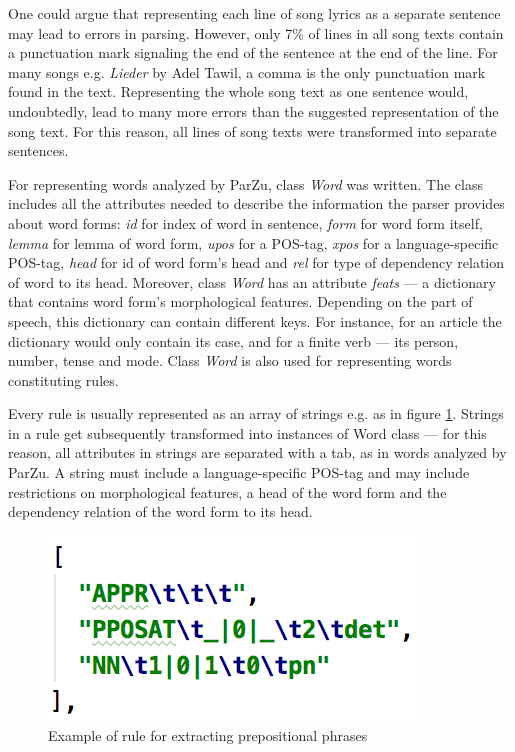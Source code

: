 One could argue that representing each line of song lyrics as a separate sentence may lead to errors in parsing. However, only 7\% of lines in all song texts contain a punctuation mark signaling the end of the sentence at the end of the line. For many songs e.g. \textit{Lieder} by Adel Tawil, a comma is the only punctuation mark found in the text. Representing the whole song text as one sentence would, undoubtedly, lead to many more errors than the suggested representation of the song text. For this reason, all lines of song texts were transformed into separate sentences. 

For representing words analyzed by ParZu, class \textit{Word} was written. The class includes all the attributes needed to describe the information the parser provides about word forms: \textit{id} for index of word in sentence, \textit{form} for word form itself, \textit{lemma} for lemma of word form, \textit{upos} for a POS-tag, \textit{xpos} for a language-specific POS-tag, \textit{head} for id of word form's head and \textit{rel} for type of dependency relation of word to its head. Moreover, class \textit{Word} has an attribute \textit{feats} --- a dictionary that contains word form's morphological features. Depending on the part of speech, this dictionary can contain different keys. For instance, for an article the dictionary would only contain its case, and for a finite verb --- its person, number, tense and mode. Class \textit{Word} is also used for representing words constituting rules.

Every rule is usually represented as an array of strings e.g. as in figure \ref{fig:pp-rule}. Strings in a rule get subsequently transformed into instances of Word class --- for this reason, all attributes in strings are separated with a tab, as in words analyzed by ParZu. A string must include a language-specific POS-tag and may include restrictions on morphological features, a head of the word form and the dependency relation of the word form to its head.

\begin{figure}[H]
    \centering
    \includegraphics[scale = 1]{images/pp-rule.png}
    \caption{Example of rule for extracting prepositional phrases}
    \label{fig:pp-rule}
\end{figure}

